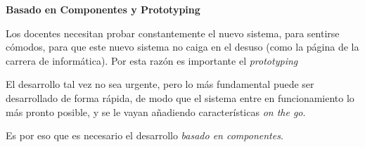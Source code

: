 \textbf{Basado en Componentes y Prototyping}

Los docentes necesitan probar constantemente el nuevo sistema, para sentirse cómodos, para que este nuevo sistema no caiga en el desuso (como la página de la carrera de informática). Por esta razón es importante el \textit{prototyping}

El desarrollo tal vez no sea urgente, pero lo más fundamental puede ser desarrollado de forma rápida, de modo que el sistema entre en funcionamiento lo más pronto posible, y se le vayan añadiendo características \textit{on the go}.

Es por eso que es necesario el desarrollo \textit{basado en componentes}.
